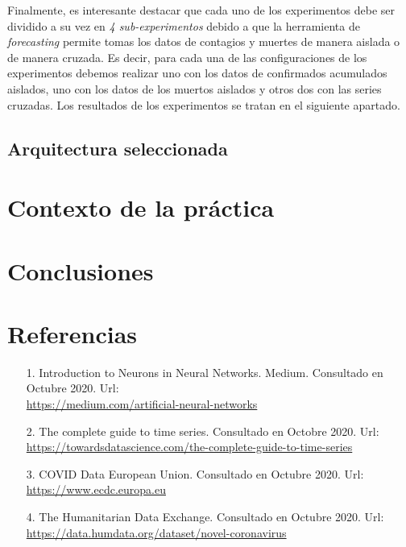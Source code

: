 \documentclass[12pt,a4paper, xcolor=table]{article}
\begin{document}
    Finalmente, es interesante destacar que cada uno de los experimentos debe ser dividido a su vez en\textit{ 4 sub-experimentos} debido a que la herramienta de \textit{forecasting} permite tomas los datos de contagios y muertes de manera aislada o de manera cruzada. Es decir, para cada una de las configuraciones de los experimentos debemos realizar uno con los datos de confirmados acumulados aislados, uno con los datos de los muertos aislados y otros dos con las series cruzadas. Los resultados de los experimentos se tratan en el siguiente apartado.

    \subsection{Arquitectura seleccionada}

\section{Contexto de la práctica}





 \section{Conclusiones}

\clearpage

\section{Referencias}
    \begin{itemize}
        \item [1.] Introduction to Neurons in Neural Networks. Medium. Consultado en Octubre 2020. Url: \\
        \href{https://medium.com/artificial-neural-networks/introduction-to-neurons-in-neural-networks-71828d040a65}{https://medium.com/artificial-neural-networks}
        \item [2.] The complete guide to time series. Consultado en Octobre 2020. Url: \\
        \href{https://towardsdatascience.com/the-complete-guide-to-time-series-analysis-and-forecasting-70d476bfe775}{https://towardsdatascience.com/the-complete-guide-to-time-series}
        \item [3.] COVID Data European Union. Consultado en Octubre 2020. Url: \\
        \href{https://www.ecdc.europa.eu/en/geographical-distribution-2019-ncov-cases}{https://www.ecdc.europa.eu}
        \item [4.] The Humanitarian Data Exchange. Consultado en Octubre 2020. Url: \\
        \href{https://data.humdata.org/dataset/novel-coronavirus-2019-ncov-cases}{https://data.humdata.org/dataset/novel-coronavirus}
    \end{itemize}
\printindex
\end{document}
